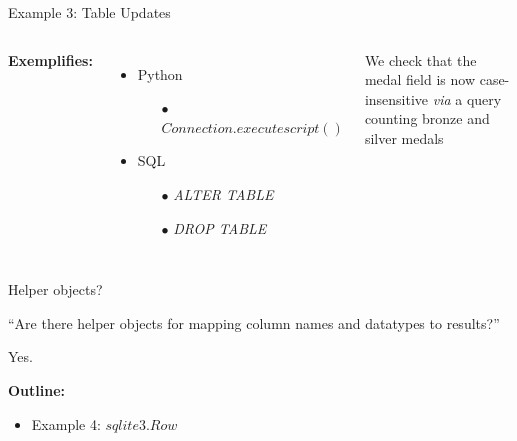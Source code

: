 \documentclass{beamer}
\begin{document}
\begin{frame}{Example 3: Table Updates}

\begin{columns}
 \scriptsize 
{\bf Exemplifies:}
\begin{itemize} \setlength\itemindent{-5pt}%
	\item Python
	\begin{itemize} \setlength\itemindent{-20pt} \scriptsize
		\item[$\bullet$] $Connection.executescript()$
	\end{itemize}
	\item SQL
	\begin{itemize} \setlength\itemindent{-20pt} \scriptsize
		\item[$\bullet$] \textit{ALTER TABLE}
		\item[$\bullet$] \textit{DROP TABLE}
	\end{itemize} 
\end{itemize}

\vspace{12pt} We check that the medal field is now case-insensitive \textit{via} a query counting bronze and silver medals



\end{columns}

\end{frame}
\begin{frame}{Helper objects?}

\vspace{2pt}\hspace{.5cm} ``Are there helper objects for mapping column names and datatypes to results?''

\vspace{12pt}\hspace{6.5cm} \Large{Yes.}

\vspace{12pt}
\large {\bf Outline:}
\begin{itemize}
\item Example 4: $sqlite3.Row$
\end{itemize}

\end{frame}
\end{document}
